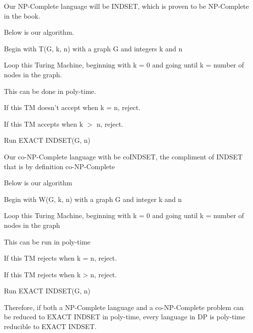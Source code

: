 \documentclass[12pt]{article}
\begin{document}
Our NP-Complete language will be INDSET, which is proven to be NP-Complete in the book.

Below is our algorithm.

Begin with T(G, k, n) with a graph G and integers k and n

Loop this Turing Machine, beginning with k = 0 and going until k = number of nodes in the graph.

This can be done in poly-time.

If this TM doesn't accept when k = n, reject.

If this TM accepts when k $>$ n, reject.

Run EXACT INDSET(G, n) 

Our co-NP-Complete language with be coINDSET, the compliment of INDSET that is by definition co-NP-Complete

Below is our algorithm

Begin with W(G, k, n) with a graph G and integer k and n

Loop this Turing Machine, beginning with k = 0 and going until k = number of nodes in the graph

This can be run in poly-time

If this TM rejects when k = n, reject.

If this TM rejects when k > n, reject.

Run EXACT INDSET(G, n)

Therefore, if both a NP-Complete language and a co-NP-Complete problem can be reduced to EXACT INDSET in
poly-time, every language in DP is poly-time reducible to EXACT INDSET.
\end{document}
